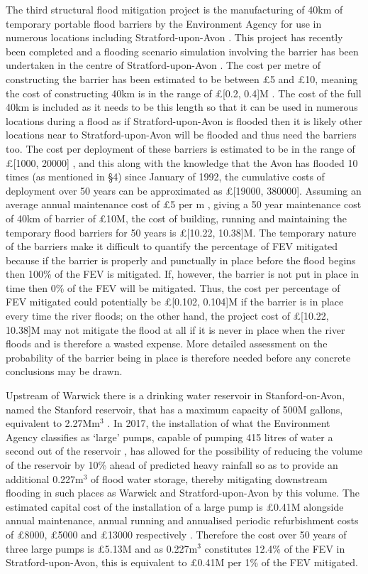 \documentclass[11pt,a4paper]{article}
\begin{document}
The third structural flood mitigation project is the manufacturing of 40km of temporary portable flood barriers by the Environment Agency for use in numerous locations including Stratford-upon-Avon \cite{lentemp}. This project has recently been completed and a flooding scenario simulation involving the barrier has been undertaken in the centre of Stratford-upon-Avon \cite{strat-flood}. The cost per metre of constructing the barrier has been estimated to be between \pounds5 and \pounds10, meaning the cost of constructing 40km is in the range of \pounds[0.2, 0.4]M \cite{temp}. The cost of the full 40km is included as it needs to be this length so that it can be used in numerous locations during a flood as if Stratford-upon-Avon is flooded then it is likely other locations near to Stratford-upon-Avon will be flooded and thus need the barriers too. The cost per deployment of these barriers is estimated to be in the range of \pounds[1000, 20000] \cite{temp}, and this along with the knowledge that the Avon has flooded 10 times (as mentioned in \S 4) since January of 1992, the cumulative costs of deployment over 50 years can be approximated as \pounds[19000, 380000]. Assuming an average annual maintenance cost of \pounds5 per m \cite{cost1}, giving a 50 year maintenance cost of 40km of barrier of \pounds10M, the cost of building, running and maintaining the temporary flood barriers for 50 years is \pounds[10.22, 10.38]M. The temporary nature of the barriers make it difficult to quantify the percentage of FEV mitigated because if the barrier is properly and punctually in place before the flood begins then 100\% of the FEV is mitigated. If, however, the barrier is not put in place in time then 0\% of the FEV will be mitigated. Thus, the cost per percentage of FEV mitigated could potentially be \pounds[0.102, 0.104]M if the barrier is in place every time the river floods{;} on the other hand, the project cost of \pounds[10.22, 10.38]M may not mitigate the flood at all if it is never in place when the river floods and is therefore a wasted expense. More detailed assessment on the probability of the barrier being in place is therefore needed before any concrete conclusions may be drawn.

Upstream of Warwick there is a drinking water reservoir in Stanford-on-Avon, named the Stanford reservoir, that has a maximum capacity of 500M gallons, equivalent to 2.27Mm$^3$ \cite{volume}. In 2017, the installation of what the Environment Agency classifies as `large' pumps, capable of pumping 415 litres of water a second out of the reservoir \cite{pump}, has allowed for the possibility of reducing the volume of the reservoir by 10\% ahead of predicted heavy rainfall so as to provide an additional 0.227m$^3$ of flood water storage, thereby mitigating downstream flooding in such places as Warwick and Stratford-upon-Avon by this volume. The estimated capital cost of the installation of a large pump is \pounds0.41M alongside annual maintenance, annual running and annualised periodic refurbishment costs of \pounds8000, \pounds5000 and \pounds13000 respectively \cite{cost2}. Therefore the cost over 50 years of three large pumps is \pounds5.13M and as 0.227m$^3$ constitutes 12.4\% of the FEV in Stratford-upon-Avon, this is equivalent to \pounds0.41M per 1\% of the FEV mitigated.
\end{document}
